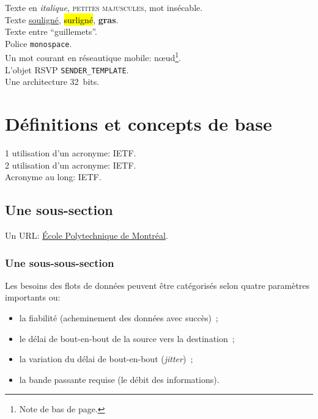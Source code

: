 \label{sec:Introduction}  %
Texte en \emph{italique}, \textsc{petites majuscules}, mot \mbox{insécable}.\\
Texte \ul{souligné}, \hl{surligné}, \textbf{gras}.\\
Texte entre ``guillemets''.\\
Police \texttt{monospace}.\\
Un mot courant en réseautique mobile: n\oe{}ud\footnote{Note de bas de page.}.\\
L'objet RSVP \texttt{SENDER\_TEMPLATE}.\\
Une architecture 32~bits.\\
\section{Définitions et concepts de base}  %
\begin{flushleft}
1\iere{} utilisation d'un acronyme: \ac{IETF}.\\
2\ieme{} utilisation d'un acronyme: \ac{IETF}.\\
Acronyme au long: \acl{IETF}.\\
\end{flushleft}

\subsection{Une sous-section}
Un URL: \href{http://www.polymtl.ca}{École Polytechnique de Montréal}.

\subsubsection{Une sous-sous-section}
Les besoins des flots de données peuvent être catégorisés selon
quatre paramètres importants \cite{Fraas2010} ou:
\begin{itemize}
\item la fiabilité (acheminement des données avec succès)~;
\item le délai de \mbox{bout-en-bout} de la source vers la destination~;
\item la variation du délai de \mbox{bout-en-bout} (\emph{jitter})~;
\item la bande passante requise (le débit des informations).
\end{itemize}


